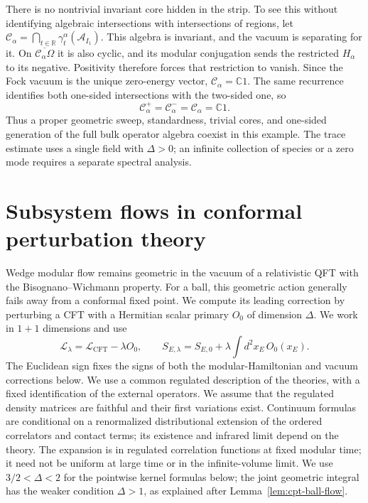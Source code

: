 \documentclass[a4paper,11pt]{article}
\theoremstyle{definition}
\begin{document}
There is no nontrivial invariant core hidden in the strip. To see
this without identifying algebraic intersections with intersections
of regions, let
$\mathcal C_\alpha=\bigcap_{t\in\mathbb R}
\gamma_t^\alpha(\mathcal A_{I_1})$.
This algebra is invariant, and the vacuum is separating for it.
On $\overline{\mathcal C_\alpha\Omega}$ it is also cyclic, and its
modular conjugation sends the restricted $H_\alpha$ to its negative.
Positivity therefore forces that restriction to vanish. Since the
Fock vacuum is the unique zero-energy vector,
$\mathcal C_\alpha=\mathbb C1$. The same recurrence identifies both
one-sided intersections with the two-sided one, so
\begin{equation}
 \mathcal C_\alpha^+
 =\mathcal C_\alpha^-
 =\mathcal C_\alpha=\mathbb C1.
 \label{eq:ads2-history-trivial-cores}
\end{equation}
Thus a proper geometric sweep, standardness, trivial cores, and
one-sided generation of the full bulk operator algebra coexist in
this example. The trace estimate uses a single field with
$\Delta>0$; an infinite collection of species or a zero mode requires
a separate spectral analysis.



\section{Subsystem flows in conformal perturbation theory}\label{section:conformalperturbation}

Wedge modular flow remains geometric in the vacuum of a relativistic QFT with the Bisognano--Wichmann property. For a ball, this geometric action generally fails away from a conformal fixed point. We compute its leading correction by perturbing a CFT with a Hermitian scalar primary $O_0$ of dimension $\Delta$. We work in $1+1$ dimensions and use
\begin{equation}
 \mathcal{L}_\lambda=\mathcal{L}_{\mathrm{CFT}}-\lambda O_0,
 \qquad S_{E,\lambda}=S_{E,0}+\lambda\int d^2x_E\,O_0(x_E).
 \label{eq:cpt-deformation}
\end{equation}
The Euclidean sign fixes the signs of both the modular-Hamiltonian and vacuum corrections below. We use a common regulated description of the theories, with a fixed identification of the external operators. We assume that the regulated density matrices are faithful and their first variations exist. Continuum formulas are conditional on a renormalized distributional extension of the ordered correlators and contact terms; its existence and infrared limit depend on the theory. The expansion is in regulated correlation functions at fixed modular time; it need not be uniform at large time or in the infinite-volume limit. We use $3/2<\Delta<2$ for the pointwise kernel formulas below; the joint geometric integral has the weaker condition $\Delta>1$, as explained after Lemma~\ref{lem:cpt-ball-flow}.
\end{document}
